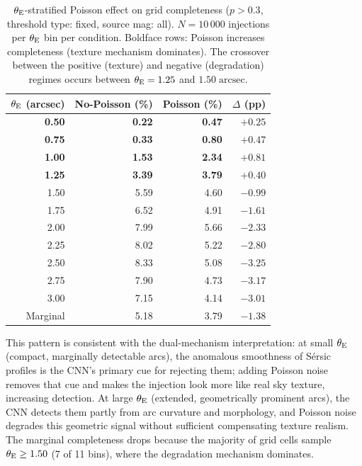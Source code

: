 \documentclass[fleqn,usenatbib]{mnras}
\begin{document}
\begin{table}
\centering
\caption{$\theta_{\rm E}$-stratified Poisson effect on grid completeness ($p > 0.3$, threshold type: fixed, source mag: all).  $N = 10\,000$ injections per $\theta_{\rm E}$ bin per condition.  Boldface rows: Poisson increases completeness (texture mechanism dominates).  The crossover between the positive (texture) and negative (degradation) regimes occurs between $\theta_{\rm E} = 1.25$ and $1.50\;\mathrm{arcsec}$.}
\label{tab:theta_e_poisson}
\begin{tabular}{rrrr}
\hline
$\theta_{\rm E}$ (arcsec) & No-Poisson (\%) & Poisson (\%) & $\Delta$ (pp) \\
\hline
\textbf{0.50} & \textbf{0.22} & \textbf{0.47} & $\mathbf{+0.25}$ \\
\textbf{0.75} & \textbf{0.33} & \textbf{0.80} & $\mathbf{+0.47}$ \\
\textbf{1.00} & \textbf{1.53} & \textbf{2.34} & $\mathbf{+0.81}$ \\
\textbf{1.25} & \textbf{3.39} & \textbf{3.79} & $\mathbf{+0.40}$ \\
1.50 & 5.59 & 4.60 & $-0.99$ \\
1.75 & 6.52 & 4.91 & $-1.61$ \\
2.00 & 7.99 & 5.66 & $-2.33$ \\
2.25 & 8.02 & 5.22 & $-2.80$ \\
2.50 & 8.33 & 5.08 & $-3.25$ \\
2.75 & 7.90 & 4.73 & $-3.17$ \\
3.00 & 7.15 & 4.14 & $-3.01$ \\
\hline
Marginal & 5.18 & 3.79 & $-1.38$ \\
\hline
\end{tabular}
\end{table}

This pattern is consistent with the dual-mechanism interpretation: at small $\theta_{\rm E}$ (compact, marginally detectable arcs), the anomalous smoothness of S\'{e}rsic profiles is the CNN's primary cue for rejecting them; adding Poisson noise removes that cue and makes the injection look more like real sky texture, increasing detection.  At large $\theta_{\rm E}$ (extended, geometrically prominent arcs), the CNN detects them partly from arc curvature and morphology, and Poisson noise degrades this geometric signal without sufficient compensating texture realism.  The marginal completeness drops because the majority of grid cells sample $\theta_{\rm E} \geq 1.50$ (7 of 11 bins), where the degradation mechanism dominates.
\end{document}

